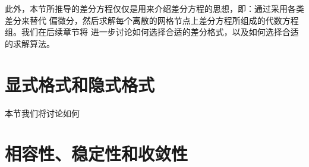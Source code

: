 此外，本节所推导的差分方程仅仅是用来介绍差分方程的思想，即：通过采用各类差分来替代
偏微分，然后求解每个离散的网格节点上差分方程所组成的代数方程组。我们在后续章节将
进一步讨论如何选择合适的差分格式，以及如何选择合适的求解算法。

\section{显式格式和隐式格式}
本节我们将讨论如何


\section{相容性、稳定性和收敛性}

